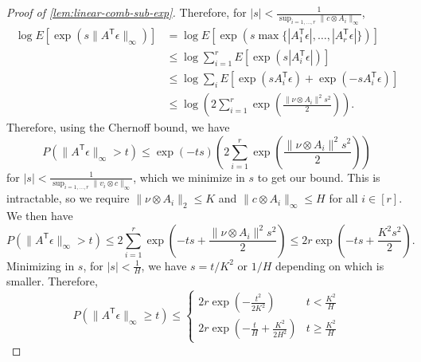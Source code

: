 \documentclass[ejs,noshowframe]{imsart}
\theoremstyle{plain}
\theoremstyle{definition}
\newcommand{\snorm}[1]{\lVert #1 \rVert}
\newcommand{\E}{E}
\renewcommand{\top}{\mathsf{T}}
\begin{document}
\begin{appendix}
\begin{proof}[Proof of \autoref{lem:linear-comb-sub-exp}]
  Therefore, for $|s| < \frac{1}{\sup_{i=1,...,r} \|c \otimes 
A_{i}\|_{\infty}}$,
  \begin{align}
    \log \E\left[ \exp(s \|A^\top \epsilon\|_{\infty})\right]
    &=\log \E\left[ \exp\left(s \max\{|A_{1}^\top \epsilon|,\ldots , 
|A_{r}^\top \epsilon|\}\right) \right]\\
    &\leq \log \sum_{i=1}^{r} \E \left[\exp\left( s | A_{i}^\top 
\epsilon|\right)\right]\\
    &\leq \log \sum_{i} \E\left[\exp\left(s A_{i}^\top \epsilon\right) + 
\exp\left(-s A_{i}^\top \epsilon \right)
    \right]\\
    &\leq \log \left( 2 \sum_{i=1}^{r} \exp\left(\frac{\|\nu \otimes
    A_{i}\|^2 s^2}{2}\right) \right).
  \end{align}
  Therefore, using the Chernoff bound, we have
  \begin{equation}
    P\left(\|A^{\top} \epsilon\|_{\infty} > t\right)
    \leq \exp(-ts)\left(2 \sum_{i=1}^{r} \exp\left(\frac{\|\nu
          \otimes A_{i}\|^2 s^2}{2} \right) \right)
  \end{equation}
  for $|s| < \frac{1}{\sup_{i=1,...,r} \|v_{i} \otimes
    c\|_{\infty}}$, which we minimize in $s$ to get our
  bound. This is intractable, so we  require $\|\nu
  \otimes A_{i}\|_2 \leq K$ and $\|c \otimes A_{i}\|_{\infty} \leq H$
  for all $i \in [r]$.  We then have
  \begin{equation}
    P(\|A^\top \epsilon\|_{\infty} > t) \leq 2 \sum_{i=1}^{r} \exp\left(-ts + 
\frac{\|\nu \otimes A_{i}\|^{2} s^2}{2} \right)
    \leq 2 r \exp\left(-t s + \frac{K^2 s^2}{2}\right).
  \end{equation}
Minimizing in $s$, for $|s | < \frac{1}{H}$, we have $s = t/K^2$ or $1/H$ 
depending on which is smaller. Therefore,
  \begin{equation}
    P\left(\snorm{A^\top \epsilon}_{\infty} \geq t \right) \leq
    \begin{cases} 2 r \exp\left(-\frac{t^2}{2 K^2}\right) &  t < \frac{K^2}{H}\\
      2 r \exp\left(-\frac{t}{H} + \frac{K^2}{2 H^2} \right) & t \geq
      \frac{K^2}{H}
    \end{cases}
  \end{equation}
\end{proof}



\end{appendix}
\end{document}
